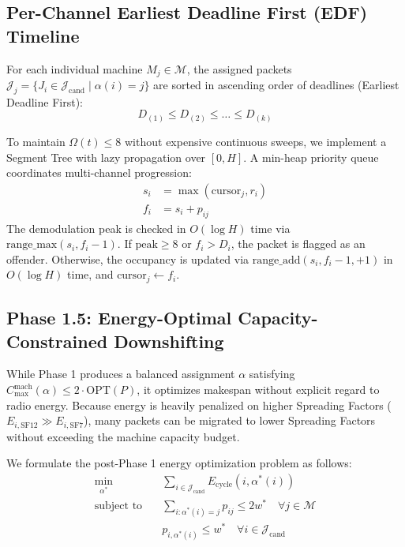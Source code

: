 \documentclass{article}
\begin{document}
\subsection{Per-Channel Earliest Deadline First (EDF) Timeline}
\label{subsec:edf_timeline}
For each individual machine $M_j \in \mathcal{M}$, the assigned packets $\mathcal{J}_j = \{J_i \in \mathcal{J}_{\text{cand}} \mid \alpha(i) = j\}$ are sorted in ascending order of deadlines (Earliest Deadline First):
\begin{equation}
D_{(1)} \le D_{(2)} \le \dots \le D_{(k)}
\end{equation}

To maintain $\Omega(t) \le 8$ without expensive continuous sweeps, we implement a Segment Tree with lazy propagation over $[0, H]$. 
A min-heap priority queue coordinates multi-channel progression:
\begin{align}
s_i &= \max\left(\text{cursor}_j, r_i\right) \\
f_i &= s_i + p_{ij}
\end{align}
The demodulation peak is checked in $O(\log H)$ time via $\text{range\_max}(s_i, f_i - 1)$. If $\text{peak} \ge 8$ or $f_i > D_i$, the packet is flagged as an offender. Otherwise, the occupancy is updated via $\text{range\_add}(s_i, f_i - 1, +1)$ in $O(\log H)$ time, and $\text{cursor}_j \leftarrow f_i$.

\subsection{Phase 1.5: Energy-Optimal Capacity-Constrained Downshifting}
\label{subsec:phase1_5_energy}
While Phase 1 produces a balanced assignment $\alpha$ satisfying $C_{\max}^{\text{mach}}(\alpha) \le 2 \cdot \text{OPT}(P)$, it optimizes makespan without explicit regard to radio energy. Because energy is heavily penalized on higher Spreading Factors ($E_{i, \text{SF12}} \gg E_{i, \text{SF7}}$), many packets can be migrated to lower Spreading Factors without exceeding the machine capacity budget.

We formulate the post-Phase 1 energy optimization problem as follows:
\begin{align}
\min_{\alpha^*} \quad & \sum_{i \in \mathcal{J}_{\text{cand}}} E_{\text{cycle}}(i, \alpha^*(i)) \label{opt:energy_obj} \\
\text{subject to} \quad & \sum_{i: \alpha^*(i) = j} p_{ij} \le 2 w^* \quad \forall j \in \mathcal{M} \label{opt:energy_cap} \\
& p_{i, \alpha^*(i)} \le w^* \quad \forall i \in \mathcal{J}_{\text{cand}} \label{opt:energy_feas}
\end{align}
\end{document}
